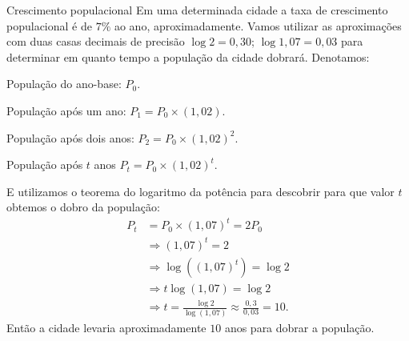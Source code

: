 \begin{example}{Crescimento populacional}
Em uma determinada cidade a taxa de crescimento populacional é de $7\%$ ao ano, aproximadamente. Vamos utilizar as aproximações com duas casas decimais de precisão $\log 2 = 0{,}30$; $\log 1{,}07 =0{,}03$ para determinar em quanto tempo a população da cidade dobrará. Denotamos:

População do ano-base: $P_0$.

População após um ano: $P_1=P_0 \times (1{,}02).$

População após dois anos: $P_2= P_0 \times (1{,}02)^2$.

População após $t$ anos $P_t =  P_0 \times (1{,}02)^t$.

E utilizamos o teorema do logaritmo da potência para descobrir para que valor $t$ obtemos o dobro da população:
\begin{align*}
P_t &= P_0 \times (1{,}07)^t = 2 P_0\\
&\Longrightarrow (1{,}07)^t = 2\\
&\Longrightarrow \log((1{,}07)^t) = \log 2\\
&\Longrightarrow t\log(1{,}07) = \log 2\\
&\Longrightarrow t = \frac{\log 2}{\log(1{,}07)}\approx\frac{0,3}{0,03}=10.
\end{align*}
Então a cidade levaria aproximadamente $10$ anos para dobrar a população.
\end{example}
\clearpage
\def\currentcolor{cor1}
\marginpar{\vspace{.5em}}
